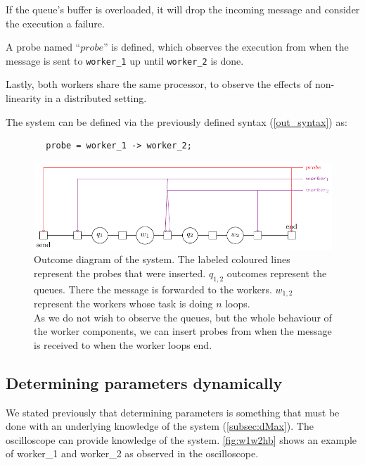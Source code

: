     If the queue's buffer is overloaded, it will drop the incoming message and consider the execution a failure.
    
    A probe named ``$probe$'' is defined, which observes the execution from when the message is sent to \texttt{worker\_1} up until \texttt{worker\_2} is done.

    Lastly, both workers share the same processor, to observe the effects of non-linearity in a distributed setting.

    The system can be defined via the previously defined syntax (\cref{out_syntax}) as: 
    
    \begin{verbatim}
        probe = worker_1 -> worker_2;
    \end{verbatim}

    \begin{figure}[H]
        \begin{center}
            \includegraphics[scale=1.2, width=\textwidth]{tikz/mm1k.pdf} 
        \end{center}
        \caption{Outcome diagram of the system. The labeled coloured lines represent the probes that were inserted. $q_{1, 2}$ outcomes represent the queues. There the message is forwarded to the workers. $w_{1,2}$ represent the workers whose task is doing $n$ loops. \\
        As we do not wish to observe the queues, but the whole behaviour of the worker components, we can insert probes from when the message is received to when the worker loops end.}
        \label{fig:mm1k}
    \end{figure}

    \subsection{Determining parameters dynamically}
        We stated previously that determining parameters is something that must be done with an underlying knowledge of the system (\cref{subsec:dMax}). The oscilloscope can provide knowledge of the system. \cref{fig:w1w2hb} shows an example of worker\_1 and worker\_2 as observed in the oscilloscope.

